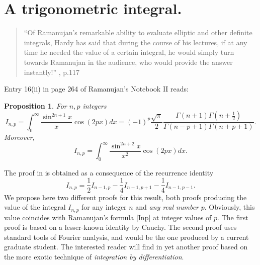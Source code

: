 \documentclass[11pt,oneside,reqno]{article}
\newtheorem*{proposition}{Proposition}
\theoremstyle{definition}
\begin{document}
\section{A trigonometric integral.}
\begin{quote}
    ``Of Ramanujan’s remarkable ability to evaluate elliptic and other definite integrals, Hardy has said that during the course of his lectures, if at any time he needed the value of a certain integral, he would simply turn towards Ramanujan in the audience, who would provide the answer instantly!'' \cite{Alladi}, p.117
\end{quote}
Entry 16(ii) in page 264 of Ramanujan's Notebook II  \cite{R2} reads: 
\begin{proposition}
For $n,p$ integers
\begin{equation}
\label{Inp}
I_{n,p}=\int_{0}^{\infty}\frac{\sin^{2n+1}x}{x}\cos\left(2px\right)dx
=\left(-1\right)^{p}\frac{\sqrt{\pi}}{2}\frac{\Gamma\left(n+1\right)\Gamma\left(n+\frac{1}{2}\right)}{\Gamma\left(n-p+1\right)\Gamma\left(n+p+1\right)}.
\end{equation}
Moreover,
\begin{equation}
\label{Inp2}
I_{n,p}=\int_{0}^{\infty}\frac{\sin^{2n+2}x}{x^{2}}\cos\left(2px\right)dx.
\end{equation}

\end{proposition}
The proof in \cite{R2} is obtained as a consequence of the recurrence identity 
\begin{equation}
I_{n,p}=\frac{1}{2}I_{n-1,p}-\frac{1}{4}I_{n-1,p+1}-\frac{1}{4}I_{n-1,p-1}.
\end{equation}
We propose here two different proofs for this result, both proofs producing the value of the integral $I_{n,p}$ for any integer $n$ and \textit{any real number} $p.$ Obviously, this value coincides with Ramanujan's formula \eqref{Inp} at integer values of $p.$
The first proof is based on a lesser-known identity by Cauchy. The second proof uses standard tools of Fourier analysis, and would be the one produced by a current graduate student.
The interested  reader will find in  \cite{Russel} yet another proof based on the more exotic technique of \textit{integration by differentiation}.
\end{document}
